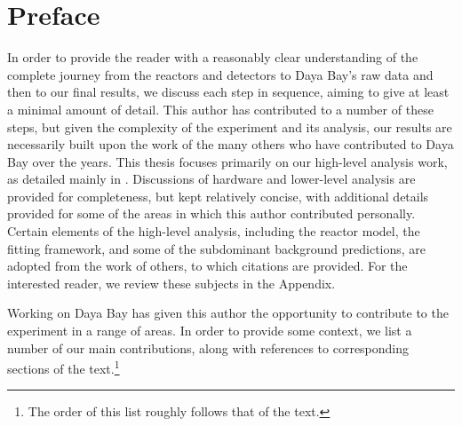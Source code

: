 \documentclass[../thesis.tex]{subfiles}
\begin{document}
\chapter*[Preface]{Preface}

In order to provide the reader with a reasonably clear understanding of the complete journey from the reactors and detectors to Daya Bay's raw data and then to our final results, we discuss each step in sequence, aiming to give at least a minimal amount of detail. This author has contributed to a number of these steps, but given the complexity of the experiment and its analysis, our results are necessarily built upon the work of the many others who have contributed to Daya Bay over the years. This thesis focuses primarily on our high-level analysis work, as detailed mainly in . Discussions of hardware and lower-level analysis are provided for completeness, but kept relatively concise, with additional details provided for some of the areas in which this author contributed personally. Certain elements of the high-level analysis, including the reactor model, the fitting framework, and some of the subdominant background predictions, are adopted from the work of others, to which citations are provided. For the interested reader, we review these subjects in the Appendix.


Working on Daya Bay has given this author the opportunity to contribute to the experiment in a range of areas. In order to provide some context, we list a number of our main contributions, along with references to corresponding sections of the text.\footnote{The order of this list roughly follows that of the text.}
\end{document}
